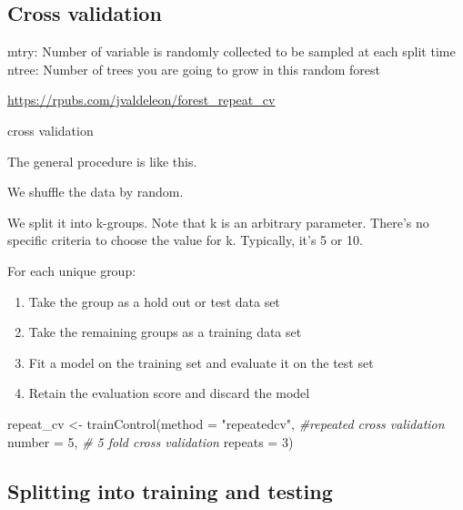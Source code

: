 \documentclass[
]{article}
\newenvironment{Shaded}{\begin{snugshade}}{\end{snugshade}}
\newcommand{\AttributeTok}[1]{\textcolor[rgb]{0.77,0.63,0.00}{#1}}
\newcommand{\CommentTok}[1]{\textcolor[rgb]{0.56,0.35,0.01}{\textit{#1}}}
\newcommand{\DecValTok}[1]{\textcolor[rgb]{0.00,0.00,0.81}{#1}}
\newcommand{\FunctionTok}[1]{\textcolor[rgb]{0.00,0.00,0.00}{#1}}
\newcommand{\NormalTok}[1]{#1}
\newcommand{\OtherTok}[1]{\textcolor[rgb]{0.56,0.35,0.01}{#1}}
\newcommand{\StringTok}[1]{\textcolor[rgb]{0.31,0.60,0.02}{#1}}
\begin{document}
\hypertarget{cross-validation}{%
\subsection{Cross validation}\label{cross-validation}}

mtry: Number of variable is randomly collected to be sampled at each
split time ntree: Number of trees you are going to grow in this random
forest

\url{https://rpubs.com/jvaldeleon/forest_repeat_cv}

cross validation

The general procedure is like this.

We shuffle the data by random.

We split it into k-groups. Note that k is an arbitrary parameter.
There's no specific criteria to choose the value for k. Typically, it's
5 or 10.

For each unique group:

\begin{enumerate}
\def\labelenumi{\arabic{enumi}.}
\item
  Take the group as a hold out or test data set
\item
  Take the remaining groups as a training data set
\item
  Fit a model on the training set and evaluate it on the test set
\item
  Retain the evaluation score and discard the model
\end{enumerate}

\begin{Shaded}
\begin{Highlighting}[]
\NormalTok{repeat\_cv }\OtherTok{\textless{}{-}} \FunctionTok{trainControl}\NormalTok{(}\AttributeTok{method =} \StringTok{"repeatedcv"}\NormalTok{, }\CommentTok{\#repeated cross validation}
                           \AttributeTok{number =} \DecValTok{5}\NormalTok{, }\CommentTok{\# 5 fold cross validation}
                           \AttributeTok{repeats =} \DecValTok{3}\NormalTok{)}
\end{Highlighting}
\end{Shaded}

\hypertarget{splitting-into-training-and-testing}{%
\subsection{Splitting into training and
testing}\label{splitting-into-training-and-testing}}
\end{document}
